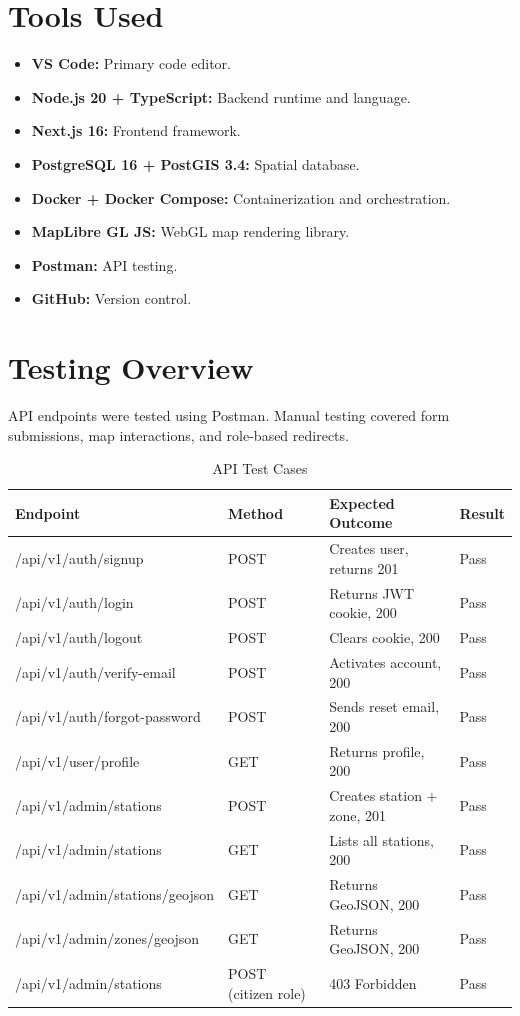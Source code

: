 \section{Tools Used}
\begin{itemize}
  \item \textbf{VS Code:} Primary code editor.
  \item \textbf{Node.js 20 + TypeScript:} Backend runtime and language.
  \item \textbf{Next.js 16:} Frontend framework.
  \item \textbf{PostgreSQL 16 + PostGIS 3.4:} Spatial database.
  \item \textbf{Docker + Docker Compose:} Containerization and orchestration.
  \item \textbf{MapLibre GL JS:} WebGL map rendering library.
  \item \textbf{Postman:} API testing.
  \item \textbf{GitHub:} Version control.
\end{itemize}

\section{Testing Overview}

API endpoints were tested using Postman. Manual testing covered form submissions, map interactions, and role-based redirects.

\begin{table}[H]
\centering
\caption{API Test Cases}
\begin{tabularx}{\textwidth}{|X|m{1.6cm}|X|m{1.2cm}|}
\hline
\textbf{Endpoint} & \textbf{Method} & \textbf{Expected Outcome} & \textbf{Result} \\
\hline
/api/v1/auth/signup & POST & Creates user, returns 201 & Pass \\
\hline
/api/v1/auth/login & POST & Returns JWT cookie, 200 & Pass \\
\hline
/api/v1/auth/logout & POST & Clears cookie, 200 & Pass \\
\hline
/api/v1/auth/verify-email & POST & Activates account, 200 & Pass \\
\hline
/api/v1/auth/forgot-password & POST & Sends reset email, 200 & Pass \\
\hline
/api/v1/user/profile & GET & Returns profile, 200 & Pass \\
\hline
/api/v1/admin/stations & POST & Creates station + zone, 201 & Pass \\
\hline
/api/v1/admin/stations & GET & Lists all stations, 200 & Pass \\
\hline
/api/v1/admin/stations/geojson & GET & Returns GeoJSON, 200 & Pass \\
\hline
/api/v1/admin/zones/geojson & GET & Returns GeoJSON, 200 & Pass \\
\hline
/api/v1/admin/stations & POST (citizen role) & 403 Forbidden & Pass \\
\hline
\end{tabularx}
\end{table}
